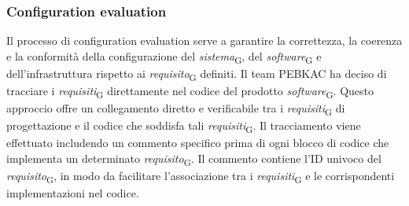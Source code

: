 \subsubsection{Configuration evaluation}
Il processo di configuration evaluation serve a garantire la correttezza, la coerenza e la conformità della configurazione del \textit{sistema}\textsubscript{G}, del \textit{software}\textsubscript{G} e dell'infrastruttura rispetto ai \textit{requisito}\textsubscript{G} definiti.
Il team PEBKAC ha deciso di tracciare i \textit{requisiti}\textsubscript{G} direttamente nel codice del prodotto \textit{software}\textsubscript{G}. Questo approccio offre un collegamento diretto e verificabile tra i \textit{requisiti}\textsubscript{G} di progettazione e il codice che soddisfa tali \textit{requisiti}\textsubscript{G}. Il tracciamento viene effettuato includendo un commento specifico prima di ogni blocco di codice che implementa un determinato \textit{requisito}\textsubscript{G}. Il commento contiene l'ID univoco del \textit{requisito}\textsubscript{G}, in modo da facilitare l'associazione tra i \textit{requisiti}\textsubscript{G} e le corrispondenti implementazioni nel codice.
